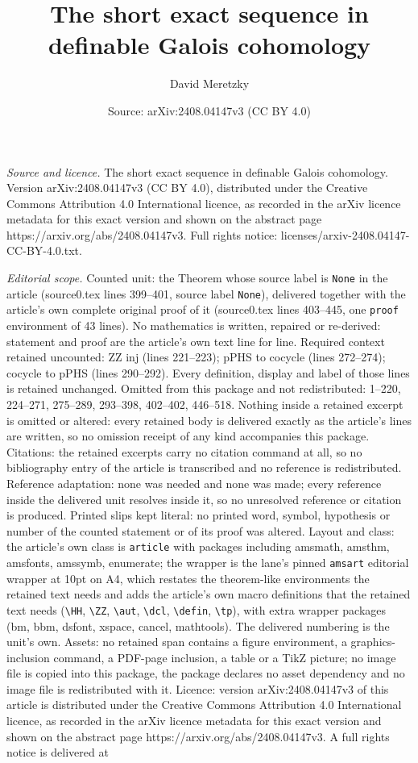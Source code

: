 \documentclass[10pt,a4paper]{amsart}
\title[The short exact sequence in definable Galois cohomology]{The short exact sequence in definable Galois cohomology}
\author{David Meretzky}
\date{Source: arXiv:2408.04147v3 (CC BY 4.0)}
\begin{document}
\maketitle

\noindent\emph{Source and licence.} The short exact sequence in definable Galois cohomology. Version arXiv:2408.04147v3 (CC BY 4.0), distributed under the Creative Commons Attribution 4.0 International licence, as recorded in the arXiv licence metadata for this exact version and shown on the abstract page https://arxiv.org/abs/2408.04147v3. Full rights notice: licenses/arxiv-2408.04147-CC-BY-4.0.txt.\par\smallskip

\noindent\textit{Editorial scope.} Counted unit: the Theorem whose source label is \texttt{None} in the article (source0.tex lines 399--401, source label \texttt{None}), delivered together with the article's own complete original proof of it (source0.tex lines 403--445, one \texttt{proof} environment of 43 lines). No mathematics is written, repaired or re-derived: statement and proof are the article's own text line for line. Required context retained uncounted: ZZ inj (lines 221--223); pPHS to cocycle (lines 272--274); cocycle to pPHS (lines 290--292). Every definition, display and label of those lines is retained unchanged. Omitted from this package and not redistributed: 1--220, 224--271, 275--289, 293--398, 402--402, 446--518. Nothing inside a retained excerpt is omitted or altered: every retained body is delivered exactly as the article's lines are written, so no omission receipt of any kind accompanies this package. Citations: the retained excerpts carry no citation command at all, so no bibliography entry of the article is transcribed and no reference is redistributed. Reference adaptation: none was needed and none was made; every reference inside the delivered unit resolves inside it, so no unresolved reference or citation is produced. Printed slips kept literal: no printed word, symbol, hypothesis or number of the counted statement or of its proof was altered. Layout and class: the article's own class is \texttt{article} with packages including amsmath, amsthm, amsfonts, amssymb, enumerate; the wrapper is the lane's pinned \texttt{amsart} editorial wrapper at 10pt on A4, which restates the theorem-like environments the retained text needs and adds the article's own macro definitions that the retained text needs (\texttt{\textbackslash HH}, \texttt{\textbackslash ZZ}, \texttt{\textbackslash aut}, \texttt{\textbackslash dcl}, \texttt{\textbackslash defin}, \texttt{\textbackslash tp}), with extra wrapper packages (bm, bbm, dsfont, xspace, cancel, mathtools). The delivered numbering is the unit's own. Assets: no retained span contains a figure environment, a graphics-inclusion command, a PDF-page inclusion, a table or a TikZ picture; no image file is copied into this package, the package declares no asset dependency and no image file is redistributed with it. Licence: version arXiv:2408.04147v3 of this article is distributed under the Creative Commons Attribution 4.0 International licence, as recorded in the arXiv licence metadata for this exact version and shown on the abstract page https://arxiv.org/abs/2408.04147v3. A full rights notice is delivered at 
\end{document}
